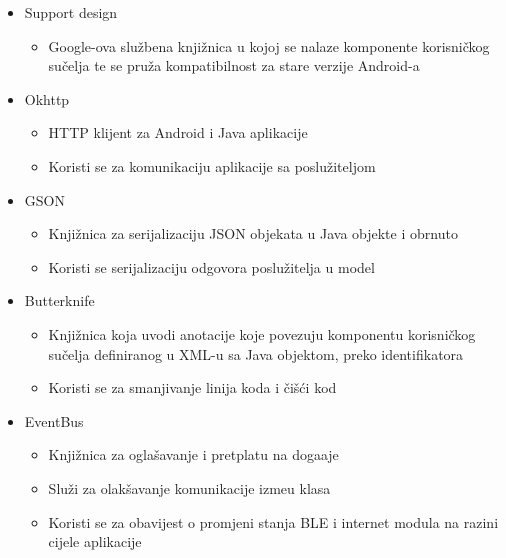 \begin{itemize}
	\item Support design
	\begin{itemize}
		\item Google-ova slu\v{z}bena knji\v{z}nica u kojoj se nalaze komponente korisni\v{c}kog su\v{c}elja te se pru\v{z}a kompatibilnost za stare verzije Android-a
	\end{itemize}

	\item Okhttp \cite{okhttp}
	\begin{itemize}
		\item HTTP klijent za Android i Java aplikacije
		\item Koristi se za komunikaciju aplikacije sa poslu\v{z}iteljom
	\end{itemize}

	\item GSON \cite{gson}
	\begin{itemize}
		\item Knji\v{z}nica za serijalizaciju JSON objekata u Java objekte i obrnuto
		\item Koristi se serijalizaciju odgovora poslu\v{z}itelja u model
	\end{itemize}
	
	\item Butterknife \cite{butterKnife}
	\begin{itemize}
		\item Knji\v{z}nica koja uvodi anotacije koje povezuju komponentu korisni\v{c}kog su\v{c}elja definiranog u XML-u sa Java objektom, preko identifikatora
		\item Koristi se za smanjivanje linija koda i \v{c}i\v{s}\'{c}i kod
	\end{itemize}


	\item EventBus \cite{eventBus}
	\begin{itemize}
		\item Knji\v{z}nica za ogla\v{s}avanje i pretplatu na doga\dj aje
		\item Slu\v{z}i za olak\v{s}avanje komunikacije izme\dj u klasa
		\item Koristi se za obavijest o promjeni stanja BLE i internet modula na razini cijele aplikacije
	\end{itemize}
\end{itemize}

